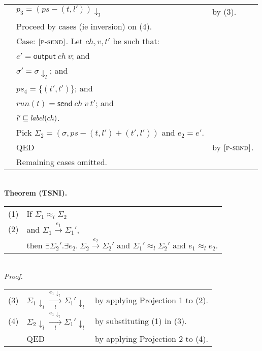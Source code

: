 \documentclass{article}
\newcommand{\rn}[1]{\text{\textsc{[#1]}}}
\newcommand{\ssteparrow}[1]{\overset{#1}{\longrightarrow}}
\newcommand{\sstep}[3]{#2\ssteparrow{#1}#3}
\newcommand{\lssteparrow}[2]{\overset{#2}{\underset{#1}{\longrightarrow}}}
\newcommand{\lsstep}[4]{#3\lssteparrow{#1}{#2}#4}
\newcommand{\s}[1]{\text{\textit{#1}}}
\newcommand{\process}[2]{(#1,#2)}
\newcommand{\opsend}[3]{\textsf{send}~#1~#2~#3}
\newcommand{\evsend}[2]{\textsf{output}~#1~#2}
\newcommand{\proj}[2]{#1{\downarrow_{#2}}}
\newcommand{\lequiv}[3]{#2\approx_{#1}#3}
\begin{document}
\begin{tabular}{l@{$\qquad$}l@{\qquad}l}
        & $p_3 = \proj{(ps-\process{t}{l'})}{l}$
        & by (3).
\\
        & Proceed by cases (ie inversion) on (4).
\\
        & Case: $\rn{p-send}$. Let $ch,v,t'$ be such that:
\\
        & \z $e'=\evsend{ch}{v}$; and
\\
        & \z $\sigma'=\proj{\sigma}{l}$; and
\\
        & \z $ps_4=\{\process{t'}{l'}\}$; and
\\
        & \z $run(t)=\opsend{ch}{v}{t'}$; and
\\
        & \z $l'\sqsubseteq\s{label}(ch)$.
\\
        & \z Pick $\Sigma_2 = (\sigma, ps-\process{t}{l'}+\process{t'}{l'})$ and $e_2=e'$.
\\
        & \z QED
        & by $\rn{p-send}$.
\\
        & Remaining cases omitted.
\end{tabular}
\\
\textbf{Theorem (TSNI).}
\\
\begin{tabular}{l@{$\qquad$}l}
  (1) & If $\lequiv{l}{\Sigma_1}{\Sigma_2}$
\\
  (2) & and $\sstep{e_1}{\Sigma_1}{\Sigma_1'}$,
\\
      & then $\exists \Sigma_2'.\exists e_2.~\sstep{e_2}{\Sigma_2}{\Sigma_2'}$
        and $\lequiv{l}{\Sigma_1'}{\Sigma_2'}$
        and $\lequiv{l}{e_1}{e_2}$.
\end{tabular}
\\
\textit{Proof.}
\\
\begin{tabular}{l@{$\qquad$}l@{\qquad}l}
  (3) & $\lsstep{l}{\proj{e_1}{l}}{\proj{\Sigma_1}{l}}{\proj{\Sigma_1'}{l}}$
      & by applying Projection 1 to (2).
\\
  (4) & $\lsstep{l}{\proj{e_1}{l}}{\proj{\Sigma_2}{l}}{\proj{\Sigma_1'}{l}}$
      & by substituting (1) in (3).
\\
      & QED
      & by applying Projection 2 to (4).
\end{tabular}
\end{document}
